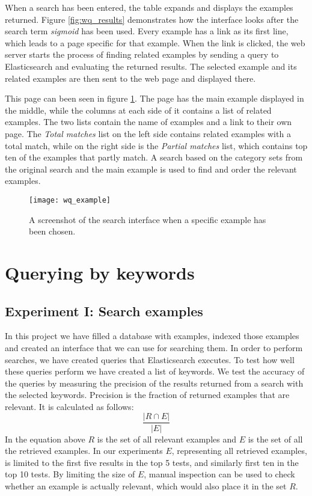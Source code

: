 When a search has been entered, the table expands and displays the examples returned. Figure \ref{fig:wq_results} demonstrates how the interface looks after the search term \textit{sigmoid} has been used. Every example has a link as its first line, which leads to a page specific for that example. When the link is clicked, the web server starts the process of finding related examples by sending a query to Elasticsearch and evaluating the returned results. The selected example and its related examples are then sent to the web page and displayed there.

This page can been seen in figure \ref{fig:wq_example}. The page has the main example displayed in the middle, while the columns at each side of it contains a list of related examples. The two lists contain the name of examples and a link to their own page. The \textit{Total matches} list on the left side contains related examples with a total match, while on the right side is the \textit{Partial matches} list, which contains top ten of the examples that partly match. A search based on the category sets from the original search and the main example is used to find and order the relevant examples.

\begin{figure}[H] 
\caption{A screenshot of the search interface when a specific example has been chosen.}
\texttt{[image: wq\_example]}
\label{fig:wq_example}
\end{figure}

\section{Querying by keywords} \label{5:keywords}

\subsection{Experiment I: Search examples} \label{search_experiment}
In this project we have filled a database with examples, indexed those examples and created an interface that we can use for searching them. In order to perform searches, we have created queries that Elasticsearch executes. To test how well these queries perform we have created a list of keywords. We test the accuracy of the queries by measuring the precision of the results returned from a search with the selected  keywords. Precision is the fraction of returned examples that are relevant. It is calculated as follows:
\[\frac{|R \cap E |}{|E|}\]
In the equation above \(R\) is the set of all relevant examples and \(E\) is the set of all the retrieved examples.
In our experiments \(E\), representing all retrieved examples, is limited to the first five results in the top 5 tests, and similarly first ten in the top 10 tests. By limiting the size of \(E\), manual inspection can be used to check whether an example is actually relevant, which would also place it in the set \(R\).

